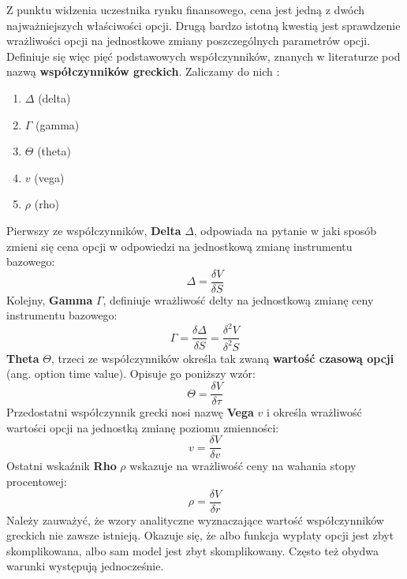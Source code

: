 \documentclass{pracamgr}
\begin{document}
Z punktu widzenia uczestnika rynku finansowego, cena jest jedną z dwóch najważniejszych 
właściwości opcji. Drugą bardzo istotną kwestią jest sprawdzenie wrażliwości opcji na jednostkowe 
zmiany poszczególnych parametrów opcji.
Definiuje się więc pięć podstawowych współczynników, znanych w literaturze pod 
nazwą \textbf{współczynników greckich}.
Zaliczamy do nich \cite{Hull}:
\begin{enumerate}
  \item $\Delta$ (delta)
  \item $\Gamma$ (gamma)
  \item $\Theta$ (theta)
  \item $v$ (vega)
  \item $\rho$ (rho)
\end{enumerate}
 

Pierwszy ze współczynników, \textbf{Delta} $\Delta$, odpowiada na pytanie w jaki 
sposób zmieni się cena opcji w odpowiedzi na
jednostkową zmianę instrumentu bazowego:
\begin{equation}
  \Delta = \frac{\delta V}{\delta S}
\end{equation} 
Kolejny, \textbf{Gamma} $\Gamma$, definiuje wrażliwość delty na 
jednostkową zmianę ceny instrumentu bazowego:
\begin{equation}
  \Gamma = \frac{\delta \Delta}{\delta S} = \frac{\delta^2 V}{\delta^2 S}
\end{equation}
\textbf{Theta} $\Theta$, trzeci ze współczynników określa tak 
zwaną \textbf{wartość czasową opcji} (ang. option time value).
Opisuje go poniższy wzór:
\begin{equation}
  \Theta = \frac{\delta V}{\delta \tau}
\end{equation}
Przedostatni współczynnik grecki nosi nazwę \textbf{Vega} $v$ i określa wrażliwość wartości 
opcji na jednostką zmianę poziomu
zmienności:
\begin{equation}
  v = \frac{\delta V}{\delta v}
\end{equation}
Ostatni wskaźnik \textbf{Rho} $\rho$ wskazuje na wrażliwość ceny na wahania stopy procentowej:
\begin{equation}
  \rho = \frac{\delta V}{\delta r}
\end{equation}
Należy zauważyć, że wzory analityczne wyznaczające wartość współczynników greckich nie zawsze istnieją. 
Okazuje się, że albo funkcja wypłaty opcji jest zbyt skomplikowana, albo sam model jest zbyt 
skomplikowany. Często też obydwa warunki występują jednocześnie. 
\end{document}
